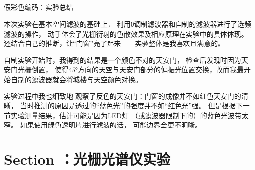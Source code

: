 \documentclass[11pt]{article}
\begin{document}
\subsection[假彩色编码：实验总结 ]{}

\begin{center}
    \begin{tcolorbox}[colback=gray!10,%
                      colframe=black,%
                      width=5cm,%
                      arc=1mm, auto outer arc,
                      boxrule=0.5pt,
                     ]
                     \begin{center}
                    假彩色编码：实验总结      
                     \end{center}
    \end{tcolorbox}
\end{center}

本次实验在基本空间滤波的基础上，
利用θ调制滤波器和自制的滤波器进行了选频滤波的操作，
动手体会了光栅衍射的色散效果及相应原理在实验中的具体体现。
还结合自己的推断，让“门窗”亮了起来——实验整体是我喜欢且满意的。

自制实验开始时，我得到的结果是一个颜色不对的天安门，
检查后发现时因为天安门光栅倒置，
使得45°方向的天空与天安门部分的偏振光位置交换，故而我最开始自制的滤波器就会将城楼与天空颜色对换。

实验过程中我也细致地
观察了反色的天安门：门窗的成像并不如红色天安门的清晰，
当时推测的原因是透过的“蓝色光”的强度并不如“红色光”强。
但是根据下一节实验测量结果，估计可能是因为LED灯
（或滤波器限制下的）的蓝色光波带太窄。
如果使用绿色透明片进行滤波的话，
可能边界会更不明晰。





























\newpage

\section[光栅和光栅仪器]{Section ：光栅光谱仪实验}
\end{document}
